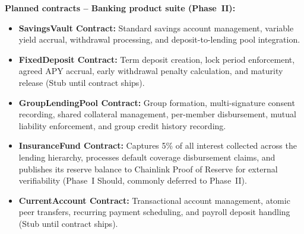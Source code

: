 \documentclass[12pt,a4paper]{report}
\begin{document}
\textbf{Planned contracts -- Banking product suite (Phase~II):}
\begin{itemize}[noitemsep]
\item \textbf{SavingsVault Contract:} Standard savings account management, variable yield accrual, withdrawal processing, and deposit-to-lending pool integration.
\item \textbf{FixedDeposit Contract:} Term deposit creation, lock period enforcement, agreed APY accrual, early withdrawal penalty calculation, and maturity release (Stub until contract ships).
\item \textbf{GroupLendingPool Contract:} Group formation, multi-signature consent recording, shared collateral management, per-member disbursement, mutual liability enforcement, and group credit history recording.
\item \textbf{InsuranceFund Contract:} Captures 5\% of all interest collected across the lending hierarchy, processes default coverage disbursement claims, and publishes its reserve balance to Chainlink Proof of Reserve for external verifiability (Phase~I Should, commonly deferred to Phase~II).
\item \textbf{CurrentAccount Contract:} Transactional account management, atomic peer transfers, recurring payment scheduling, and payroll deposit handling (Stub until contract ships).
\end{itemize}
\end{document}
